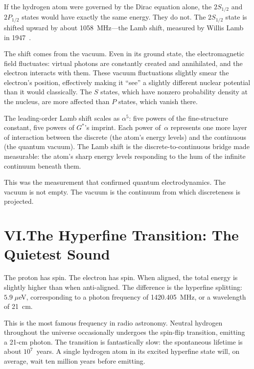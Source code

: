 \documentclass[11pt,a4paper]{article}
\newcommand{\Gstar}{G^{*}}
\begin{document}
If the hydrogen atom were governed by the Dirac equation alone, the
$2S_{1/2}$ and $2P_{1/2}$ states would have exactly the same energy.  They
do not.  The $2S_{1/2}$ state is shifted upward by about 1058~MHz---the Lamb
shift, measured by Willis Lamb in 1947~\cite{lamb47}.

The shift comes from the vacuum.  Even in its ground state, the
electromagnetic field fluctuates: virtual photons are constantly created and
annihilated, and the electron interacts with them.  These vacuum
fluctuations slightly smear the electron's position, effectively making it
``see'' a slightly different nuclear potential than it would classically.
The $S$ states, which have nonzero probability density at the nucleus, are
more affected than $P$ states, which vanish there.

The leading-order Lamb shift scales as $\alpha^5$: five powers of the
fine-structure constant, five powers of $\Gstar$'s imprint.  Each power
of~$\alpha$ represents one more layer of interaction between the discrete
(the atom's energy levels) and the continuous (the quantum vacuum).  The
Lamb shift is the discrete-to-continuous bridge made measurable: the atom's
sharp energy levels responding to the hum of the infinite continuum beneath
them.

This was the measurement that confirmed quantum electrodynamics.  The vacuum
is not empty.  The vacuum is the continuum from which discreteness is
projected.

\section*{VI.\quad The Hyperfine Transition: The Quietest Sound}

The proton has spin.  The electron has spin.  When aligned, the total energy
is slightly higher than when anti-aligned.  The difference is the hyperfine
splitting: $5.9\;\mu$eV, corresponding to a photon frequency of
1420.405~MHz, or a wavelength of 21~cm.

This is the most famous frequency in radio astronomy.  Neutral hydrogen
throughout the universe occasionally undergoes the spin-flip transition,
emitting a 21-cm photon.  The transition is fantastically slow: the
spontaneous lifetime is about $10^7$~years.  A single hydrogen atom in its
excited hyperfine state will, on average, wait ten million years before
emitting.
\end{document}
